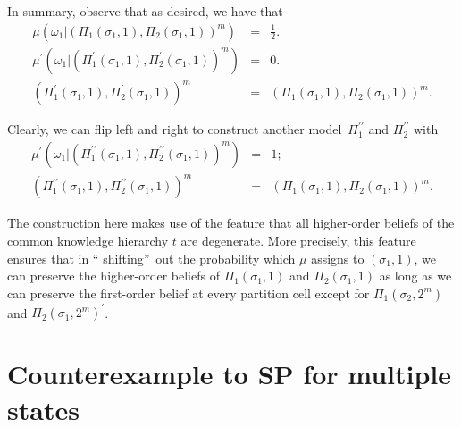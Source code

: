 \documentclass[12pt,reqno]{amsart}
\begin{document}
 In summary, observe that as desired, we have that
\begin{eqnarray*}
\mu \left( \omega _{1}|\left( \Pi _{1}\left( \sigma_{1},1\right) ,\Pi _{2}\left(
\sigma_{1},1\right) \right) ^{m}\right) &=&\frac{1}{2}\text{.} \\
\mu ^{\prime }\left( \omega _{1}|\left( \Pi _{1}^{\prime }\left(
\sigma_{1},1\right) ,\Pi _{2}^{\prime }\left( \sigma_{1},1\right) \right) ^{m}\right)
&=&0\text{.} \\
\left( \Pi _{1}^{\prime }\left( \sigma_{1},1\right) ,\Pi _{2}^{\prime }\left(
\sigma_{1},1\right) \right) ^{m} &=&\left( \Pi _{1}\left( \sigma_{1},1\right) ,\Pi
_{2}\left( \sigma_{1},1\right) \right) ^{m}\text{.}
\end{eqnarray*}

Clearly, we can flip left and right to construct another model\ $\Pi
_{1}^{\prime \prime }$ and $\Pi _{2}^{\prime \prime }$ with 
\begin{eqnarray*}
\mu ^{\prime }\left( \omega _{1}|\left( \Pi _{1}^{\prime \prime }\left(
\sigma_{1},1\right) ,\Pi _{2}^{\prime \prime }\left( \sigma_{1},1\right) \right)
^{m}\right) &=&1\text{;} \\
\left( \Pi _{1}^{\prime \prime }\left( \sigma_{1},1\right) ,\Pi _{2}^{\prime
\prime }\left( \sigma_{1},1\right) \right) ^{m} &=&\left( \Pi _{1}\left(
\sigma_{1},1\right) ,\Pi _{2}\left( \sigma_{1},1\right) \right) ^{m}\text{.}
\end{eqnarray*}

The construction here makes use of the feature that all higher-order
beliefs of the common knowledge hierarchy $t$ are degenerate. More
precisely, this feature ensures that in \textquotedblleft
shifting\textquotedblright\ out the probability which $\mu $ assigns to $%
\left( \sigma_{1},1\right) $, we can preserve the higher-order beliefs of $\Pi
_{1}\left( \sigma_{1},1\right) $ and $\Pi _{2}\left( \sigma_{1},1\right) $ as long as
we can preserve the first-order belief at every partition cell except for $%
\Pi _{1}\left( \sigma_{2},2^{m}\right) $ and $\Pi _{2}\left( \sigma_{1},2^{m}\right)
^{\prime }$. 

\section{\texorpdfstring{ Counterexample to SP}{Counterexample to SP} for multiple states}\label{app:counterex}
\end{document}

